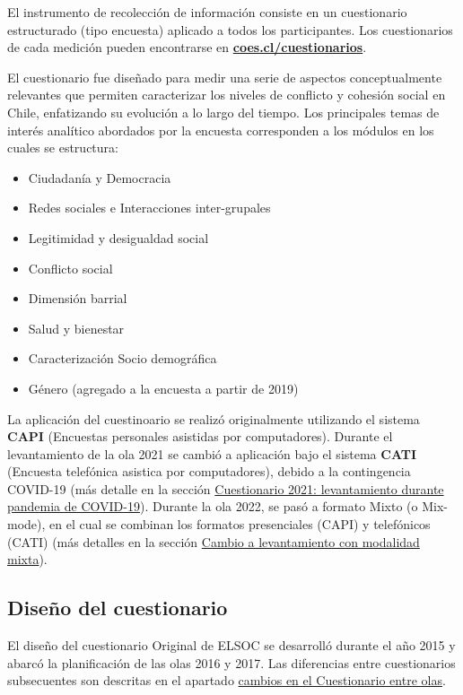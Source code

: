 \documentclass[
  12pt,
]{article}
\providecommand{\tightlist}{%
  \setlength{\itemsep}{0pt}\setlength{\parskip}{0pt}}
\begin{document}
El instrumento de recolección de información consiste en un cuestionario estructurado (tipo encuesta) aplicado a todos los participantes. Los cuestionarios de cada medición pueden encontrarse en \href{https://coes.cl/cuestionarios/}{\textbf{coes.cl/cuestionarios}}.

El cuestionario fue diseñado para medir una serie de aspectos conceptualmente relevantes que permiten caracterizar los niveles de conflicto y cohesión social en Chile, enfatizando su evolución a lo largo del tiempo. Los principales temas de interés analítico abordados por la encuesta corresponden a los módulos en los cuales se estructura:

\begin{itemize}
\tightlist
\item
  Ciudadanía y Democracia
\item
  Redes sociales e Interacciones inter-grupales
\item
  Legitimidad y desigualdad social
\item
  Conflicto social
\item
  Dimensión barrial
\item
  Salud y bienestar
\item
  Caracterización Socio demográfica
\item
  Género (agregado a la encuesta a partir de 2019)
\end{itemize}

La aplicación del cuestinoario se realizó originalmente utilizando el sistema \textbf{CAPI} (Encuestas personales asistidas por computadores). Durante el levantamiento de la ola 2021 se cambió a aplicación bajo el sistema \textbf{CATI} (Encuesta telefónica asistica por computadores), debido a la contingencia COVID-19 (más detalle en la sección \protect\hyperlink{instrumento-covid}{Cuestionario 2021: levantamiento durante pandemia de COVID-19}). Durante la ola 2022, se pasó a formato Mixto (o Mix-mode), en el cual se combinan los formatos presenciales (CAPI) y telefónicos (CATI) (más detalles en la sección \protect\hyperlink{instrumento-mixmode}{Cambio a levantamiento con modalidad mixta}).

\hypertarget{dis-cuestionario}{%
\subsection{Diseño del cuestionario}\label{dis-cuestionario}}

El diseño del cuestionario Original de ELSOC se desarrolló durante el año 2015 y abarcó la planificación de las olas 2016 y 2017. Las diferencias entre cuestionarios subsecuentes son descritas en el apartado \protect\hyperlink{dif-cuest-olas}{cambios en el Cuestionario entre olas}.
\end{document}
